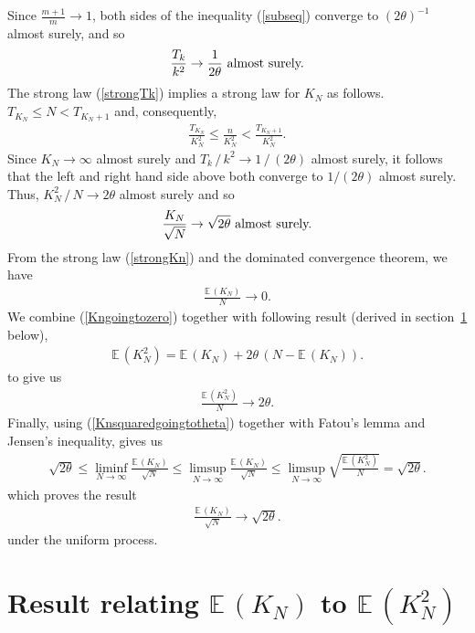 \documentclass{article}
\begin{document}
Since $\frac{m + 1}{m} \to 1$, both sides of the inequality (\ref{subseq}) converge to $(2\theta)^{-1}$ almost surely, and so 
\begin{align}
\frac{T_k}{k^2} \to \frac{1}{2\theta} \hbox{ almost surely.}  \label{strongTk}
\end{align}
The strong law (\ref{strongTk}) implies a strong law for $K_N$ as follows. $T_{K_N} \leq N < T_{K_N + 1}$ and, consequently,
\begin{align*}
\frac{T_{K_N}}{K_N^2} \leq \frac{n}{K_N^2} < \frac{T_{K_N +
1}}{K_N^2}.
\end{align*}
Since $K_N \to \infty$ almost surely and $T_k\,/\,k^2 \to 1\,/\,(2\theta)$ almost surely, it follows that the left and
right hand side above both converge to $1/(2\theta)$ almost surely.  Thus, $K_N^2 \,/\, N \to 2\theta$ almost surely and so
\begin{align}
\frac{K_N}{\sqrt{N}} \to \sqrt{2\theta} \hbox{ almost surely.}   \label{strongKn}
\end{align}
From the strong law (\ref{strongKn}) and the dominated convergence theorem, we have 
\begin{align}
\frac{\mathbb{E}\,(K_N)}{N} \to 0.  \label{Kngoingtozero}
\end{align}
We combine (\ref{Kngoingtozero}) together with following result (derived in section~\ref{momentlemma} below), 
\begin{align}
\mathbb{E}\,(K_N^2) = \mathbb{E}\,(K_N) + 2\theta\,(N - \mathbb{E}\,(K_N)). \label{twomoments}
\end{align}
to give us 
\begin{align}
\frac{\mathbb{E}\,(K_N^2)}{N} \to 2\theta. \label{Knsquaredgoingtotheta}
\end{align}
Finally, using (\ref{Knsquaredgoingtotheta}) together with Fatou's lemma and Jensen's inequality, gives us
\begin{align*}
\sqrt{2\theta} \leq \liminf_{N \to \infty} \frac{\mathbb{E}\,(K_N)}{\sqrt{N}} \leq
\limsup_{N \to \infty} \frac{\mathbb{E}\,(K_N)}{\sqrt{N}} \leq \limsup_{N \to
\infty} \sqrt{\frac{\mathbb{E}\,(K_N^2)}{N}} = \sqrt{2\theta}.
\end{align*}
which proves the result
\begin{align*}
\frac{\mathbb{E}\,(K_N)}{\sqrt{N}} \to \sqrt{2\theta}.
\end{align*}
under the uniform process. 

\section{Result relating $\mathbb{E}\,(K_N)$ to  $\mathbb{E}\,(K_N^2)$} \label{momentlemma}
\end{document}
